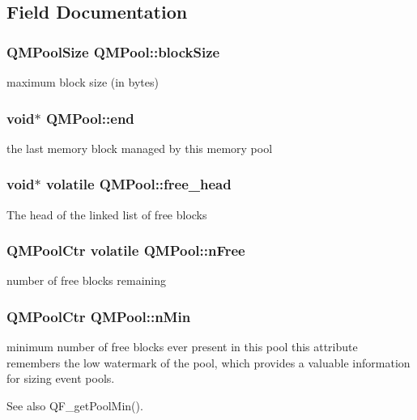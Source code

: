 \subsection{Field Documentation}
\subsubsection[{\texorpdfstring{block\+Size}{blockSize}}]{\setlength{\rightskip}{0pt plus 5cm}Q\+M\+Pool\+Size Q\+M\+Pool\+::block\+Size}\hypertarget{structQMPool_afa43a09e05f8e8820e90c51e5b86d3e2}{}\label{structQMPool_afa43a09e05f8e8820e90c51e5b86d3e2}
maximum block size (in bytes) 
\subsubsection[{\texorpdfstring{end}{end}}]{\setlength{\rightskip}{0pt plus 5cm}void$\ast$ Q\+M\+Pool\+::end}\hypertarget{structQMPool_a7e03b2b1de179b9ad5e618d0622521fc}{}\label{structQMPool_a7e03b2b1de179b9ad5e618d0622521fc}
the last memory block managed by this memory pool 
\subsubsection[{\texorpdfstring{free\+\_\+head}{free_head}}]{\setlength{\rightskip}{0pt plus 5cm}void$\ast$ volatile Q\+M\+Pool\+::free\+\_\+head}\hypertarget{structQMPool_a5e8248b793788b181c1a13c39f2100c2}{}\label{structQMPool_a5e8248b793788b181c1a13c39f2100c2}
The head of the linked list of free blocks 
\subsubsection[{\texorpdfstring{n\+Free}{nFree}}]{\setlength{\rightskip}{0pt plus 5cm}Q\+M\+Pool\+Ctr volatile Q\+M\+Pool\+::n\+Free}\hypertarget{structQMPool_a9078988aa441f41305a142aec0187f55}{}\label{structQMPool_a9078988aa441f41305a142aec0187f55}
number of free blocks remaining 
\subsubsection[{\texorpdfstring{n\+Min}{nMin}}]{\setlength{\rightskip}{0pt plus 5cm}Q\+M\+Pool\+Ctr Q\+M\+Pool\+::n\+Min}\hypertarget{structQMPool_aebecbafcf2b06319016b737d0bf6337f}{}\label{structQMPool_aebecbafcf2b06319016b737d0bf6337f}
minimum number of free blocks ever present in this pool  this attribute remembers the low watermark of the pool, which provides a valuable information for sizing event pools. \begin{DoxySeeAlso}{See also}
Q\+F\+\_\+get\+Pool\+Min(). 
\end{DoxySeeAlso}
